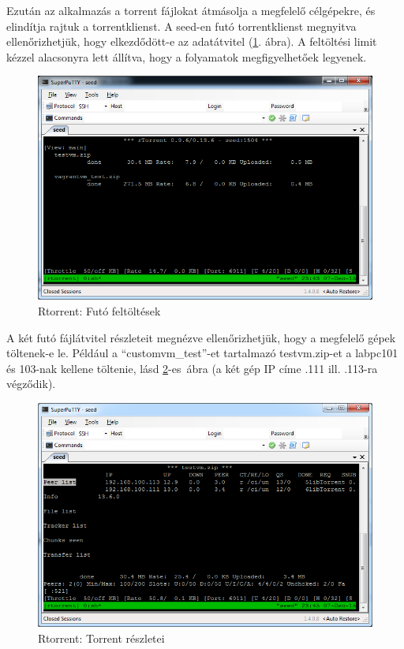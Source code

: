 Ezután az alkalmazás a torrent fájlokat átmásolja a megfelelő célgépekre, és elindítja rajtuk a torrentklienst. A seed-en futó torrentklienst megnyitva ellenőrizhetjük, hogy elkezdődött-e az adatátvitel (\ref{fig:seed_torrent}. ábra). A feltöltési limit kézzel alacsonyra lett állítva, hogy a folyamatok megfigyelhetőek legyenek.

\begin{figure}[ht]
\centering
\includegraphics[width=120mm, keepaspectratio]{figures/test_seed_torrent.png}
\caption{Rtorrent: Futó feltöltések}
\label{fig:seed_torrent}
\end{figure}

A két futó fájlátvitel részleteit megnézve ellenőrizhetjük, hogy a megfelelő gépek töltenek-e le. Például a ``customvm\_test''-et tartalmazó testvm.zip-et a labpc101 és 103-nak kellene töltenie, lásd \ref{fig:seed_peers}-es~ábra (a két gép IP címe .111 ill. .113-ra végződik).

\begin{figure}[ht]
\centering
\includegraphics[width=120mm, keepaspectratio]{figures/test_seed_peers.png}
\caption{Rtorrent: Torrent részletei}
\label{fig:seed_peers}
\end{figure}

